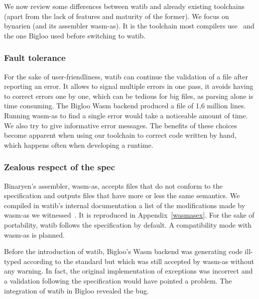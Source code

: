\documentclass[a4paper,11pt]{article}
\begin{document}
We now review some differences between \textsf{watib} and already existing
toolchains (apart from the lack of features and maturity of the former). We
focus on bynarien (and its assembler \textsf{wasm-as}). It is the toolchain most
compilers use~\cite{Binaryen} and the one Bigloo used before switching to
\textsf{watib}.
\subsubsection{Fault tolerance}
For the sake of user-friendliness, \textsf{watib} can continue the validation of
a file after reporting an error. It allows to signal multiple errors in one
pass, it avoids having to correct errors one by one, which can be tedious
for big files, as parsing alone is time consuming. The Bigloo Wasm backend
produced a file of 1,6 million lines. Running \textsf{wasm-as} to find a single
error would take a noticeable amount of time. We also try to give informative
error messages. The benefits of these choices become apparent when using our
toolchain to correct code written by hand, which happens often when developing a
runtime.

\subsubsection{{Zealous\protect\footnotemark} respect of the spec}
Binaryen's assembler, \textsf{wasm-as}, accepts files that do not conform to the
specification and outputs files that have more or less the same semantics. We
compiled in \textsf{watib}'s internal documentation a list of the modifications
made by \textsf{wasm-as} we witnessed~\cite{WasmAsExtension}. It is reproduced
in Appendix~\ref{wasmasex}. For the sake of portability, \textsf{watib} follows
the specification by default. A compatibility mode with \textsf{wasm-as} is
planned.

Before the introduction of \textsf{watib}, Bigloo's Wasm backend was generating
code ill-typed according to the standard but which was still accepted by
\textsf{wasm-as} without any warning. In fact, the original implementation of
exceptions was incorrect and a validation following the specification would have
pointed a problem. The integration of \textsf{watib} in Bigloo revealed the bug.
\end{document}
